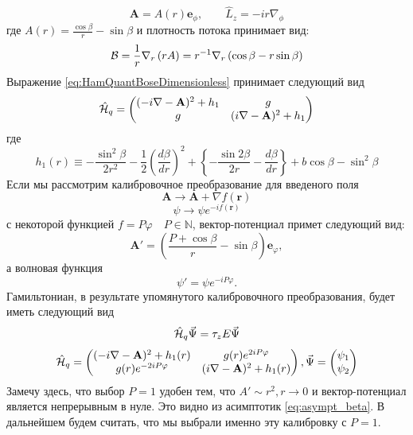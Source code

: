 \documentclass[a4paper,article,14pt]{extarticle}
\begin{document}
$$
\mathbf{A} = A(r) \mathbf{e}_\phi ,  \qquad  \hat{L}_{z} = - i r \nabla_\phi
$$
где $A(r) = \frac{ \cos\beta } { r } - \sin \beta$ и плотность потока принимает вид:
$$
{\cal B}  = \frac 1 r \nabla_r \left(r A \right) = 
r^{-1}  \nabla_r \left(\cos\beta   -  r  \sin \beta \right)  
$$
Выражение \eqref{eq:HamQuantBoseDimensionless} принимает следующий вид
\begin{equation}
\hat {\cal H}_{q} =\begin{pmatrix} (- i \nabla - \mathbf{A} ) ^ 2 + h_1 & g \\ g & ( i \nabla - \mathbf{A} ) ^ 2 + h_1 \end{pmatrix}
\end{equation}
где
\begin{equation}
h_1(r) \equiv  -\frac{\sin^2 \beta }{2r^2} - \frac{1}{2}\left( \frac{d\beta }{dr} \right)^2 +  \left\{  - \frac{\sin 2\beta }{2r}  - \frac{d\beta }{dr} \right\} + b\cos \beta - \sin ^ 2 \beta
\end{equation}
Если мы рассмотрим калибровочное преобразование для введеного поля 
$$
\mathbf{A} \rightarrow \mathbf{A} + \nabla f(\mathbf{r})
$$
$$
\psi \rightarrow \psi e ^ {- i f(\mathbf{r})}
$$
с некоторой функцией  $f = P \varphi \quad P \in \mathbb{N}$, вектор-потенциал примет следующий вид:
$$
\mathbf{A'}= \left(\frac {P + \cos{\beta}} {r} - \sin{\beta} \right) \mathbf{e}_\varphi,
$$
а волновая функция
$$
\psi' = \psi e^{-i P \varphi}.
$$
Гамильтониан, в результате упомянутого калибровочного преобразования, будет иметь следующий вид
\begin{equation}
\label{eq:init_ham_landau}
\hat {\cal H}_{q} \vec{\Psi} = \tau_z E \vec{\Psi}
\end{equation}
$$
\hat {\cal H}_{q} =\begin{pmatrix} (- i \nabla - \mathbf{A} ) ^ 2 + h_1 (r) &  g (r) e^{2 i P \varphi} \\  g (r) e^{-2 i P \varphi}   & ( i \nabla - \mathbf{A} ) ^ 2 + h_1 (r) \end{pmatrix}, \vec{\Psi} = \begin{pmatrix}  \psi_1 \\ \psi_2 \end{pmatrix}
$$
Замечу здесь, что выбор $P=1$ удобен тем, что $A' \sim r^2, r \rightarrow 0$ и вектор-потенциал является непрерывным в нуле. Это видно из асимптотик \eqref{eq:asympt_beta}. В дальнейшем будем считать, что мы выбрали именно эту калибровку с $P=1$.
\end{document}
